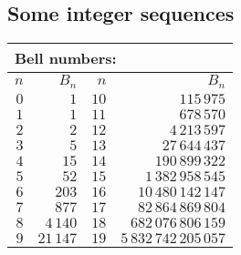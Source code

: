 \documentclass{article}
\begin{document}
\subsection{Some integer sequences}
\begin{center}
\begin{tabular}{|r|r|r|r|}
\hline
\multicolumn{4}{|l|}{Bell numbers:} \\
\hline
$n$ & $B_n$ & $n$ & $B_n$ \\
\hline
$0$ & $1$ & $10$ & $115\,975$ \\
\hline
$1$ & $1$ & $11$ & $678\,570$ \\
\hline
$2$ & $2$ & $12$ & $4\,213\,597$ \\
\hline
$3$ & $5$ & $13$ & $27\,644\,437$ \\
\hline
$4$ & $15$ & $14$ & $190\,899\,322$ \\
\hline
$5$ & $52$ & $15$ & $1\,382\,958\,545$ \\
\hline
$6$ & $203$ & $16$ & $10\,480\,142\,147$ \\
\hline
$7$ & $877$ & $17$ & $82\,864\,869\,804$ \\
\hline
$8$ & $4\,140$ & $18$ & $682\,076\,806\,159$ \\
\hline
$9$ & $21\,147$ & $19$ & $5\,832\,742\,205\,057$\\
\hline
\end{tabular}
\end{center}
\end{document}
